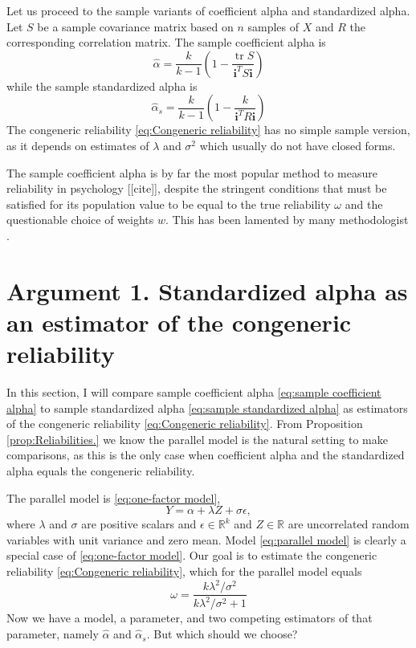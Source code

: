 \documentclass{article}
\theoremstyle{plain}
\theoremstyle{plain}
\theoremstyle{definition}
\theoremstyle{remark}
\theoremstyle{definition}
\theoremstyle{plain}
\theoremstyle{plain}
\theoremstyle{definition}
\DeclareMathOperator{\tr}{tr}
\begin{document}
Let us proceed to the sample variants of coefficient alpha and standardized
alpha. Let $S$ be a sample covariance matrix based on
$n$ samples of $X$ and $R$ the corresponding correlation matrix.
The sample coefficient alpha is 
\begin{equation}
\widehat{\alpha}=\frac{k}{k-1}\left(1-\frac{\tr{S}}{\mathbf{i}^{T}S\mathbf{i}}\right)\label{eq:sample coefficient alpha}
\end{equation}
while the sample standardized alpha is
\begin{equation}
\widehat{\alpha}_s=\frac{k}{k-1}\left(1-\frac{k}{\mathbf{i}^{T}R\mathbf{i}}\right)\label{eq:sample standardized alpha}
\end{equation}
The congeneric reliability \eqref{eq:Congeneric reliability} has no
simple sample version, as it depends on estimates of $\lambda$ and
$\sigma^{2}$ which usually do not have closed forms.

The sample coefficient alpha is by far the most popular method to
measure reliability in psychology [[cite]], despite the stringent conditions
that must be satisfied for its population value to be equal to the
true reliability $\omega$ and the questionable choice of weights $w$. This has been lamented by
many methodologist \citep[see e.g.][]{McNeish2018-vu,hancock2001rethinking, McNeish2019-ea}.

\section{Argument 1. Standardized alpha as an estimator of the congeneric reliability}
\label{sec:arument 1}

In this section, I will compare sample coefficient alpha \eqref{eq:sample coefficient alpha} to sample standardized alpha \eqref{eq:sample standardized alpha} as estimators of the congeneric reliability \eqref{eq:Congeneric reliability}. From Proposition \ref{prop:Reliabilities.} we know the parallel model is the natural setting to make comparisons, as this is the only case when coefficient alpha and the standardized alpha equals the congeneric reliability.

The parallel model is
\eqref{eq:one-factor model},
\begin{equation}
\label{eq:parallel model}
Y = \alpha + \lambda Z + \sigma\epsilon,
\end{equation}
where $\lambda$ and $\sigma$ are positive scalars and $\epsilon\in\mathbb{R}^k$ and $Z\in\mathbb{R}$ are uncorrelated random variables with unit variance and zero mean. Model \eqref{eq:parallel model} is clearly a special case of \eqref{eq:one-factor model}. Our goal is to estimate the congeneric reliability \eqref{eq:Congeneric reliability}, which for the parallel model equals
\begin{equation}
\label{eq:parallel_omega}
\omega = \frac{k\lambda^2/\sigma^2}{k\lambda^2/\sigma^2 + 1}
\end{equation}
Now we have a model, a parameter, and two competing estimators of that parameter, namely $\widehat{\alpha}$ and $\widehat{\alpha}_s$. But which should we choose? 
\end{document}

